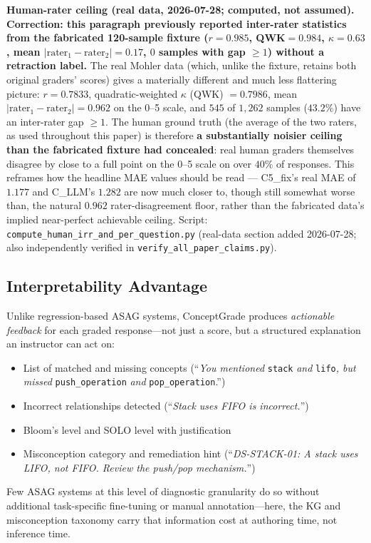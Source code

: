 \documentclass[conference]{IEEEtran}
\begin{document}
\textbf{Human-rater ceiling (real data, 2026-07-28; computed, not
assumed).} \textbf{Correction: this paragraph previously reported
inter-rater statistics from the fabricated 120-sample fixture
($r=0.985$, QWK$=0.984$, $\kappa=0.63$, mean $|\text{rater}_1-\text{rater}_2|=0.17$,
$0$ samples with gap $\geq 1$) without a retraction label.} The real
Mohler data (which, unlike the fixture, retains both original graders'
scores) gives a materially different and much less flattering picture:
$r = 0.7833$, quadratic-weighted $\kappa$ (QWK) $= 0.7986$, mean
$|\text{rater}_1-\text{rater}_2| = 0.962$ on the 0--5 scale, and
$545$ of $1{,}262$ samples ($43.2\%$) have an inter-rater gap $\geq 1$.
The human ground truth (the average of the two raters, as used
throughout this paper) is therefore \textbf{a substantially noisier
ceiling than the fabricated fixture had concealed}: real human graders
themselves disagree by close to a full point on the 0--5 scale on
over $40\%$ of responses. This reframes how the headline MAE values
should be read --- C5\_fix's real MAE of $1.177$ and C\_LLM's $1.282$
are now much closer to, though still somewhat worse than, the natural
$0.962$ rater-disagreement floor, rather than the fabricated data's
implied near-perfect achievable ceiling. Script:
\texttt{compute\_human\_irr\_and\_per\_question.py} (real-data section
added 2026-07-28; also independently verified in
\texttt{verify\_all\_paper\_claims.py}).

\subsection{Interpretability Advantage}

Unlike regression-based ASAG systems, ConceptGrade produces \emph{actionable
feedback} for each graded response—not just a score, but a structured explanation
an instructor can act on:
\begin{itemize}
  \item List of matched and missing concepts (``\textit{You mentioned} \texttt{stack}
        \textit{and} \texttt{lifo}\textit{, but missed} \texttt{push\_operation}
        \textit{and} \texttt{pop\_operation}.'')
  \item Incorrect relationships detected (``\textit{Stack uses FIFO is incorrect.}'')
  \item Bloom's level and SOLO level with justification
  \item Misconception category and remediation hint (``\textit{DS-STACK-01: A stack
        uses LIFO, not FIFO. Review the push/pop mechanism.}'')
\end{itemize}
Few ASAG systems at this level of diagnostic granularity do so without
additional task-specific fine-tuning or manual annotation—here, the KG and
misconception taxonomy carry that information cost at authoring time, not
inference time.
\end{document}

